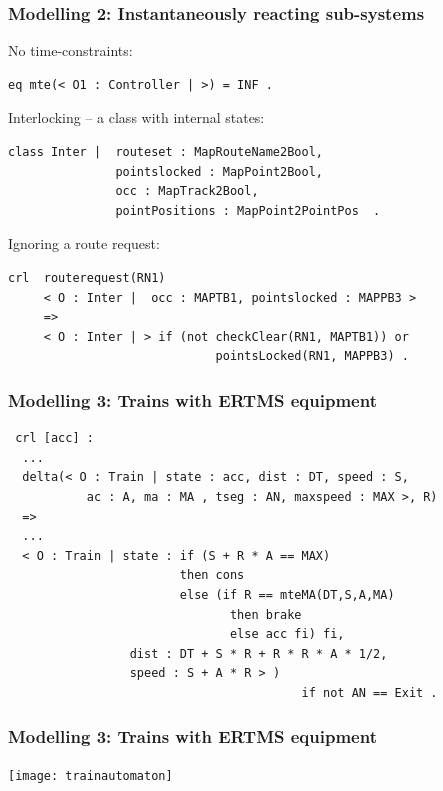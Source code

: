 \documentclass{beamer}
\begin{document}
\begin{frame}[fragile]
\frametitle{Modelling 2: Instantaneously reacting sub-systems}

No time-constraints:
\begin{verbatim}
eq mte(< O1 : Controller | >) = INF .
\end{verbatim} 

Interlocking -- a class with internal states:
\begin{verbatim}
class Inter |  routeset : MapRouteName2Bool, 
               pointslocked : MapPoint2Bool,
               occ : MapTrack2Bool, 
               pointPositions : MapPoint2PointPos  .
\end{verbatim}

Ignoring a route request:
\begin{verbatim}
crl  routerequest(RN1) 
     < O : Inter |  occ : MAPTB1, pointslocked : MAPPB3 >
     => 
     < O : Inter | > if (not checkClear(RN1, MAPTB1)) or 
                             pointsLocked(RN1, MAPPB3) .
\end{verbatim}

\end{frame}



\begin{frame}[fragile]
\frametitle{Modelling 3: Trains with ERTMS equipment} 
\begin{verbatim}
 crl [acc] :
  ...
  delta(< O : Train | state : acc, dist : DT, speed : S, 
           ac : A, ma : MA , tseg : AN, maxspeed : MAX >, R)
  =>
  ... 
  < O : Train | state : if (S + R * A == MAX)     
                        then cons 
                        else (if R == mteMA(DT,S,A,MA)
                               then brake
                               else acc fi) fi, 
                 dist : DT + S * R + R * R * A * 1/2,
                 speed : S + A * R > )
                                         if not AN == Exit .
\end{verbatim}      
\end{frame}



\begin{frame}
\frametitle{Modelling 3:  Trains with ERTMS equipment}
\begin{center}
\texttt{[image: trainautomaton]}
\end{center}
\end{frame}
\end{document}
